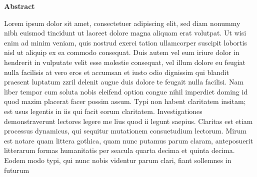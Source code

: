 \begin{headingpage}
\begin{center}\Large \textbf{Abstract}\end{center}

Lorem ipsum dolor sit amet, consectetuer adipiscing elit, sed diam nonummy nibh
euismod tincidunt ut laoreet dolore magna aliquam erat volutpat. Ut wisi enim ad
minim veniam, quis nostrud exerci tation ullamcorper suscipit lobortis nisl ut
aliquip ex ea commodo consequat. Duis autem vel eum iriure dolor in hendrerit in
vulputate velit esse molestie consequat, vel illum dolore eu feugiat nulla
facilisis at vero eros et accumsan et iusto odio dignissim qui blandit praesent
luptatum zzril delenit augue duis dolore te feugait nulla facilisi. Nam liber
tempor cum soluta nobis eleifend option congue nihil imperdiet doming id quod
mazim placerat facer possim assum. Typi non habent claritatem insitam; est usus
legentis in iis qui facit eorum claritatem. Investigationes demonstraverunt
lectores legere me lius quod ii legunt saepius. Claritas est etiam processus
dynamicus, qui sequitur mutationem consuetudium lectorum. Mirum est notare quam
littera gothica, quam nunc putamus parum claram, anteposuerit litterarum formas
humanitatis per seacula quarta decima et quinta decima. Eodem modo typi, qui
nunc nobis videntur parum clari, fiant sollemnes in futurum






\end{headingpage}
